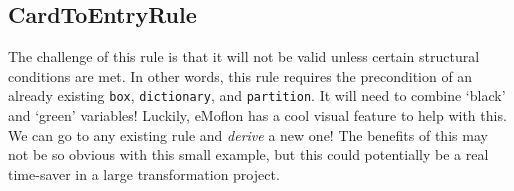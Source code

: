 \newpage
\subsection{CardToEntryRule}

The challenge of this rule is that it will not be valid unless certain structural conditions are met. In other words, this rule requires the
precondition of an already existing \texttt{box}, \texttt{dictionary}, and \texttt{partition}. It will need to combine `black' and `green' variables! Luckily,
eMoflon has a cool visual feature to help with this. We can go to any existing rule and \emph{derive} a new one! The benefits of this may not be so obvious with
this small example, but this could potentially be a real time-saver in a large transformation project.

